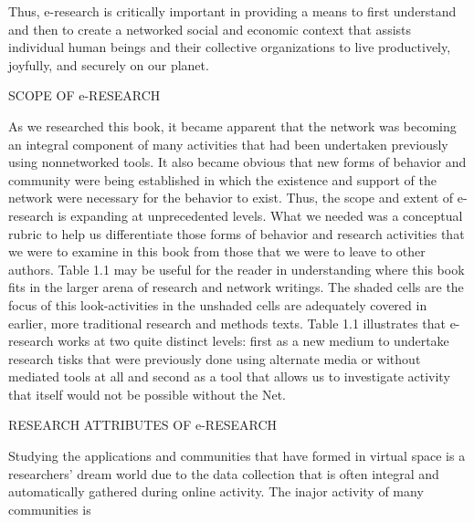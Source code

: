 \documentclass [8pt]{beamer}
\begin{document}
\begin{frame}
	
	Thus, e-research is critically important in providing a means to first understand and then to create a networked social and economic context that assists individual human beings and their collective organizations to live productively, joyfully, and securely on our planet.
	
    \begin{flushleft}
    SCOPE OF e-RESEARCH	
    \end{flushleft}

    As we researched this book, it became apparent that the network was becoming an integral component of many activities that had been undertaken previously using nonnetworked tools. It also became obvious that new forms of behavior and community were being established in which the existence and support of the network were necessary for the behavior to exist. Thus, the scope and extent of e-research is expanding at unprecedented levels. What we needed was a conceptual rubric to help us differentiate those forms of behavior and research activities that we were to examine in this book from those that we were to leave to other authors. Table 1.1 may be useful for the reader in understanding where this book fits in the larger arena of research and network writings. The shaded cells are the focus of this look-activities in the unshaded cells are adequately covered in earlier, more traditional research and methods texts. Table 1.1 illustrates that e-research works at two quite distinct levels: first as a new medium to undertake research tisks that were previously done using alternate media or without mediated tools at all and second as a tool that allows us to investigate activity that itself would not be possible without the Net.
    
    \begin{flushleft}
    	RESEARCH ATTRIBUTES OF e-RESEARCH	
    \end{flushleft}
    
    Studying the applications and communities that have formed in virtual space is a researchers' dream world due to the data collection that is often integral and automatically gathered during online activity. The inajor activity of many communities is
		
\end{frame}	
\end{document}
